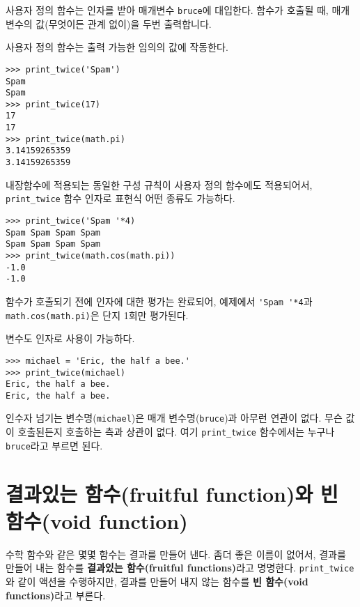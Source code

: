 사용자 정의 함수는 인자를 받아 매개변수 {\tt bruce}에 대입한다. 
함수가 호출될 때, 매개변수의 값(무엇이든 관계 없이)을 두번 출력합니다.

사용자 정의 함수는 출력 가능한 임의의 값에 작동한다.

\beforeverb
\begin{verbatim}
>>> print_twice('Spam')
Spam
Spam
>>> print_twice(17)
17
17
>>> print_twice(math.pi)
3.14159265359
3.14159265359
\end{verbatim}
\afterverb
%

내장함수에 적용되는 동일한 구성 규칙이 사용자 정의 함수에도 적용되어서, \verb"print_twice" 함수 인자로 표현식 어떤 종류도 가능하다. 


\beforeverb
\begin{verbatim}
>>> print_twice('Spam '*4)
Spam Spam Spam Spam
Spam Spam Spam Spam
>>> print_twice(math.cos(math.pi))
-1.0
-1.0
\end{verbatim}
\afterverb
%

함수가 호출되기 전에 인자에 대한 평가는 완료되어, 
예제에서 \verb"'Spam '*4"과 {\tt math.cos(math.pi)}은 단지 1회만 평가된다.


변수도 인자로 사용이 가능하다.

\beforeverb
\begin{verbatim}
>>> michael = 'Eric, the half a bee.'
>>> print_twice(michael)
Eric, the half a bee.
Eric, the half a bee.
\end{verbatim}
\afterverb
%

인수자 넘기는 변수명({\tt michael})은 매개 변수명({\tt bruce})과 아무런 연관이 없다.
무슨 값이 호출된든지 호출하는 측과 상관이 없다. 
여기 \verb"print_twice" 함수에서는 누구나 {\tt bruce}라고 부르면 된다.

\section{결과있는 함수(fruitful function)와 빈 함수(void function)}


수학 함수와 같은 몇몇 함수는 결과를 만들어 낸다. 
좀더 좋은 이름이 없어서, 결과를 만들어 내는 함수를 {\bf 결과있는 함수(fruitful functions)}라고 명명한다.
\verb"print_twice"와 같이 액션을 수행하지만, 결과를 만들어 내지 않는 함수를 {\bf 빈 함수(void functions)}라고 부른다.

